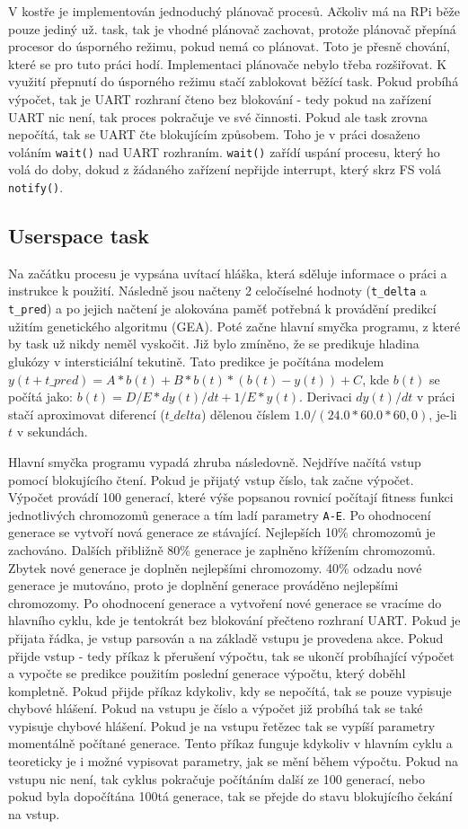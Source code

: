 \documentclass[12pt, letterpaper]{article}
\begin{document}
V kostře je implementován jednoduchý plánovač procesů. Ačkoliv má na RPi běže pouze jediný už. task, tak je vhodné
plánovač zachovat, protože plánovač přepíná procesor do úsporného režimu, pokud nemá co plánovat. Toto je přesně 
chování, které se pro tuto práci hodí. Implementaci plánovače nebylo třeba rozšiřovat. K využití přepnutí do 
úsporného režimu stačí zablokovat běžící task. Pokud probíhá výpočet, tak je UART rozhraní čteno bez 
blokování - tedy pokud na zařízení UART nic není, tak proces pokračuje ve své činnosti. Pokud ale task zrovna 
nepočítá, tak se UART čte blokujícím způsobem. Toho je v práci dosaženo voláním \texttt{wait()} nad UART rozhraním. 
\texttt{wait()} zařídí uspání procesu, který ho volá do doby, dokud z žádaného zařízení nepřijde interrupt, který
skrz FS volá \texttt{notify()}.
%
\subsection{Userspace task}
Na začátku procesu je vypsána uvítací hláška, která sděluje informace o práci a instrukce k použití. Následně jsou
načteny 2 celočíselné hodnoty (\texttt{t\_delta} a \texttt{t\_pred}) a po jejich načtení je alokována paměť 
potřebná k provádění predikcí užitím genetického
algoritmu (GEA). Poté začne hlavní smyčka programu, z které by task už nikdy neměl vyskočit. Již bylo zmíněno, že 
se predikuje hladina glukózy v intersticiální tekutině. Tato predikce je počítána modelem 
$y(t + t\_pred) = A * b(t) + B * b(t) * (b(t) - y(t)) + C$, kde $b(t)$ se počítá jako: 
$b(t) = D/E * dy(t)/dt + 1/E * y(t)$. Derivaci $dy(t)/dt$ v práci stačí aproximovat diferencí ($t\_delta$) 
dělenou číslem $1.0 / (24.0 * 60.0 * 60,0)$, je-li $t$ v sekundách.

Hlavní smyčka programu vypadá zhruba následovně. Nejdříve načítá vstup pomocí blokujícího čtení. Pokud je přijatý vstup 
číslo, tak začne výpočet. Výpočet provádí 100 generací, které výše popsanou rovnicí počítají fitness funkci 
jednotlivých chromozomů generace a tím ladí parametry \texttt{A-E}. Po ohodnocení generace se vytvoří nová
generace ze stávající. Nejlepších 10\% chromozomů je zachováno. Dalších přibližně 80\% generace je zaplněno křížením
chromozomů. Zbytek nové generace je doplněn nejlepšími chromozomy. 40\% odzadu nové generace je mutováno, proto 
je doplnění generace prováděno nejlepšími chromozomy. Po ohodnocení generace a vytvoření nové generace se vracíme
do hlavního cyklu, kde je tentokrát bez blokování přečteno rozhraní UART. Pokud je přijata řádka, je vstup parsován
a na základě vstupu je provedena akce. Pokud přijde vstup  - tedy příkaz k přerušení výpočtu, tak se ukončí 
probíhající výpočet a vypočte se predikce použitím poslední generace výpočtu, který doběhl kompletně. Pokud přijde 
příkaz  kdykoliv, kdy se nepočítá, tak se pouze vypisuje chybové hlášení. Pokud na vstupu je číslo a výpočet již
probíhá tak se také vypisuje chybové hlášení. Pokud je na vstupu řetězec  tak se vypíší parametry momentálně
počítané generace. Tento příkaz funguje kdykoliv v hlavním cyklu a teoreticky je i možné vypisovat parametry, jak se
mění během výpočtu. Pokud na vstupu nic není, tak cyklus pokračuje počítáním další ze 100 generací, nebo pokud 
byla dopočítána 100tá generace, tak se přejde do stavu blokujícího čekání na vstup.
%
\end{document}
